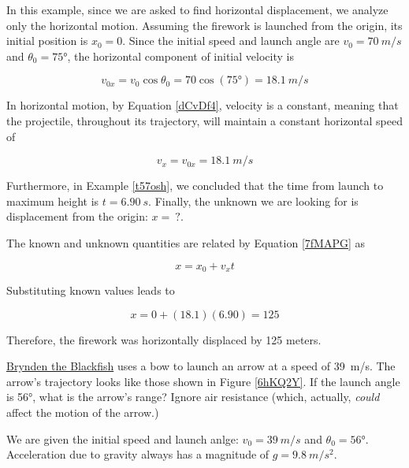 \documentclass{article}
\begin{document}
\Solution In this example, since we are asked to find horizontal displacement, we analyze only the horizontal motion. Assuming the firework is launched from the origin, its initial position is $x_0 = 0$. Since the initial speed and launch angle are $v_0 = \SI{70}{m/s}$ and $\theta_0 = \ang{75}$,  the horizontal component of initial velocity is

\begin{equation*}
    v_{0x} = v_0 \cos{\theta_0} = 70 \cos{(\ang{75})} = \SI{18.1}{m/s}
\end{equation*}

In horizontal motion, by Equation \eqref{dCvDf4}, velocity is a constant, meaning that the projectile, throughout its trajectory, will maintain a constant horizontal speed of 

\begin{equation*}
    v_x = v_{0x} = \SI{18.1}{m/s}
\end{equation*}


Furthermore, in Example \ref{t57osh}, we concluded that the time from launch to maximum height is $t = \SI{6.90}{s}$. Finally, the unknown we are looking for is displacement from the origin: $x =\ ?$.

\vspace{1em}

The known and unknown quantities are related by Equation \eqref{7fMAPG} as

\begin{equation*}
    x = x_0 + v_x t
\end{equation*}

Substituting known values leads to 

\begin{equation*}
    x = 0 + (18.1)(6.90) = 125 
\end{equation*}

Therefore, the firework was horizontally displaced by 125 meters.

\endsolution

\begin{example}
    \href{https://youtu.be/9Ijev8RHF04}{Brynden the Blackfish} uses a bow to launch an arrow at a speed of \SI{39}{m/s}. The arrow's trajectory looks like those shown in Figure \ref{6hKQ2Y}. If the launch angle is \ang{56}, what is the arrow's range? Ignore air resistance (which, actually, \textit{could} affect the motion of the arrow.) 
\end{example}

\Solution We are given the initial speed and launch anlge: $v_0 = \SI{39}{m/s}$ and $\theta_0 = \ang{56}$. Acceleration due to gravity always has a magnitude of $g = \SI{9.8}{m/s^2}$. 
\end{document}
